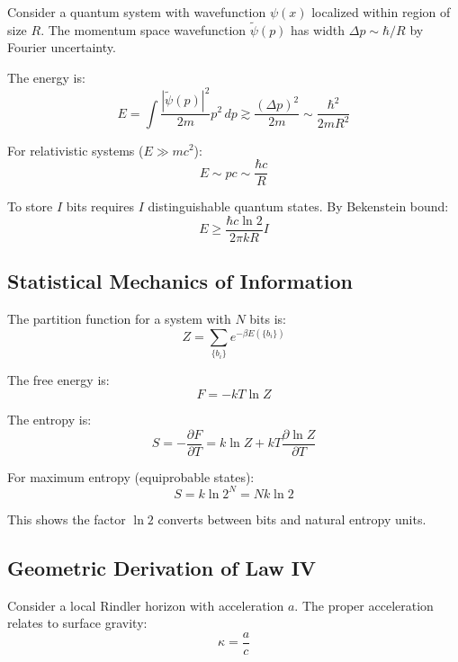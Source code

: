\documentclass[11pt,a4paper]{article}
\theoremstyle{plain}
\theoremstyle{definition}
\theoremstyle{remark}
\begin{document}
Consider a quantum system with wavefunction $\psi(x)$ localized within region of size $R$. The momentum space wavefunction $\tilde{\psi}(p)$ has width $\Delta p \sim \hbar/R$ by Fourier uncertainty.

The energy is:
\begin{equation}
E = \int\frac{|\tilde{\psi}(p)|^2}{2m}p^2\,dp \gtrsim \frac{(\Delta p)^2}{2m} \sim \frac{\hbar^2}{2mR^2}
\end{equation}

For relativistic systems ($E \gg mc^2$):
\begin{equation}
E \sim pc \sim \frac{\hbar c}{R}
\end{equation}

To store $I$ bits requires $I$ distinguishable quantum states. By Bekenstein bound:
\begin{equation}
E \geq \frac{\hbar c\ln 2}{2\pi kR}I
\end{equation}

\subsection{Statistical Mechanics of Information}

The partition function for a system with $N$ bits is:
\begin{equation}
Z = \sum_{\{b_i\}} e^{-\beta E(\{b_i\})}
\end{equation}

The free energy is:
\begin{equation}
F = -kT\ln Z
\end{equation}

The entropy is:
\begin{equation}
S = -\frac{\partial F}{\partial T} = k\ln Z + kT\frac{\partial\ln Z}{\partial T}
\end{equation}

For maximum entropy (equiprobable states):
\begin{equation}
S = k\ln 2^N = Nk\ln 2
\end{equation}

This shows the factor $\ln 2$ converts between bits and natural entropy units.

\subsection{Geometric Derivation of Law IV}

Consider a local Rindler horizon with acceleration $a$. The proper acceleration relates to surface gravity:
\begin{equation}
\kappa = \frac{a}{c}
\end{equation}
\end{document}
